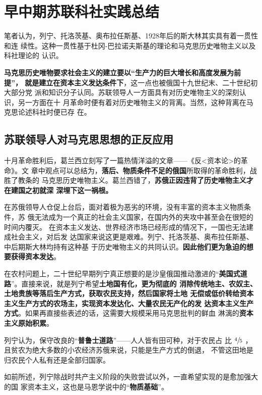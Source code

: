 \section{早中期苏联科社实践总结}
\label{sec:sushijian}

笔者认为，列宁、托洛茨基、奥布拉任斯基、1928年后的斯大林其实具有着一贯性和连
续性。这种一贯性基于杜冈-巴拉诺夫斯基的理论和马克思历史唯物主义以及科社理论的
认识。

\textbf{马克思历史唯物要求社会主义的建立要以“生产力的巨大增长和高度发展为前提”，
  就是建立在资本主义发达条件下}，这一点也被俄国十九世纪末、二十世纪初大部分党
派和知识分子认同。苏联领导人一方面具有对历史唯物主义的深刻认识，另一方面在十
月革命时便有着对历史唯物主义的背离。当然，这种背离在马克思论述科社时便已存
在。

\subsection{苏联领导人对马克思思想的正反应用}
\label{subsec:shenkerenshi}


十月革命胜利后，葛兰西立刻写了一篇热情洋溢的文章——《反<资本论>的革命》。文
章中观点可以总结为，\textbf{落后、物质条件不足的俄国}所取得的革命胜利，战胜了教条的
马克思历史唯物主义。葛兰西错了，\textbf{苏俄正因违背了历史唯物主义才在建国之初就深
  深埋下这一祸根。}

在苏俄领导人仓促上台后，面对着极为恶劣的环境，没有丰富的资本主义物质条件，苏
俄无法成为一个真正的社会主义国家，在国内外的夹攻中甚至会在很短的时间内覆灭。
在资本主义发达、世界经济市场已经形成的情况下，一国也无法建成社会主义，对后发
达国家来说这更是艰难。列宁、托洛茨基、奥布拉任斯基、中后期斯大林均持有这种基
于历史唯物主义的共同认识。\textbf{因此他们更为急迫的想要获得资本发达}。


在农村问题上，二十世纪早期列宁真正想要的是沙皇俄国推动激进的“\textbf{美国式道
  路}”\cite{chenxintianamerica}。直接来说，就是列宁希望\textbf{土地国有化，更为彻底的
  消除传统地主、农奴主、土地贵族等落后生产方式，获取农民支持，然后国家将土地
  无偿或低价转给资本主义生产方式的农场主，实现资本发达化、大量农民无产化的发
  达资本主义生产方式}。如果再直接些表述的话，这需要大规模采用马克思批判的鲜血
淋漓的\textbf{资本主义原始积累}。

列宁认为，保守改良的“\textbf{普鲁士道路}”——人人皆有田可种，对于农民占
比 $\sfrac{4}{5}$ ，且贫农为绝大多数的小农经济苏俄来说，只能是生产方式的倒退，
不管这田地是归农民个人私有还是全部归国家。

如前所述，列宁除战时共产主义阶段的失败尝试以外，一直希望实现的是愈加强大的国
家资本主义，这也是马恩学说中的“\textbf{物质基础}”。

